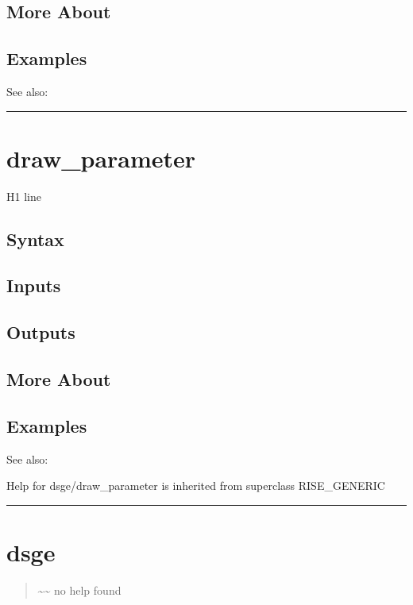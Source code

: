\documentclass[letterpaper,10pt,english]{sphinxmanual}
\begin{document}
\subsection{More About}
\label{classes/models/@dsge/dsge:id24}

\subsection{Examples}
\label{classes/models/@dsge/dsge:id25}
See also:


\bigskip\hrule{}\bigskip



\section{draw\_parameter}
\label{classes/models/@dsge/dsge:draw-parameter}\label{classes/models/@dsge/dsge:id26}
H1 line


\subsection{Syntax}
\label{classes/models/@dsge/dsge:id27}

\subsection{Inputs}
\label{classes/models/@dsge/dsge:id28}

\subsection{Outputs}
\label{classes/models/@dsge/dsge:id29}

\subsection{More About}
\label{classes/models/@dsge/dsge:id30}

\subsection{Examples}
\label{classes/models/@dsge/dsge:id31}
See also:

Help for dsge/draw\_parameter is inherited from superclass RISE\_GENERIC


\bigskip\hrule{}\bigskip



\section{dsge}
\label{classes/models/@dsge/dsge:id32}\label{classes/models/@dsge/dsge:dsge}\begin{quote}

\textasciitilde{}\textasciitilde{} no help found
\end{quote}
\end{document}
